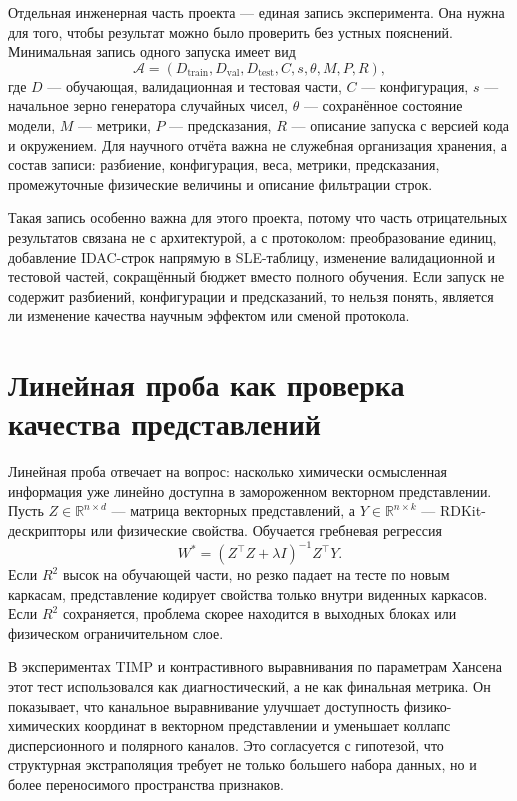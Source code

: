 \documentclass[11pt]{article}
\theoremstyle{definition}
\begin{document}
Отдельная инженерная часть проекта --- единая запись эксперимента. Она нужна для того, чтобы результат можно было проверить без устных пояснений. Минимальная запись одного запуска имеет вид
\begin{equation*}
    \mathcal A
    =
    (D_{\mathrm{train}},D_{\mathrm{val}},D_{\mathrm{test}},
     C,s,\theta,M,P,R),
\end{equation*}
где $D$ --- обучающая, валидационная и тестовая части, $C$ --- конфигурация, $s$ --- начальное зерно генератора случайных чисел, $\theta$ --- сохранённое состояние модели, $M$ --- метрики, $P$ --- предсказания, $R$ --- описание запуска с версией кода и окружением. Для научного отчёта важна не служебная организация хранения, а состав записи: разбиение, конфигурация, веса, метрики, предсказания, промежуточные физические величины и описание фильтрации строк.

Такая запись особенно важна для этого проекта, потому что часть отрицательных результатов связана не с архитектурой, а с протоколом: преобразование единиц, добавление IDAC-строк напрямую в SLE-таблицу, изменение валидационной и тестовой частей, сокращённый бюджет вместо полного обучения. Если запуск не содержит разбиений, конфигурации и предсказаний, то нельзя понять, является ли изменение качества научным эффектом или сменой протокола.

\section{Линейная проба как проверка качества представлений}
\label{app:linear-probe}

Линейная проба отвечает на вопрос: насколько химически осмысленная информация уже линейно доступна в замороженном векторном представлении. Пусть $Z\in\mathbb R^{n\times d}$ --- матрица векторных представлений, а $Y\in\mathbb R^{n\times k}$ --- RDKit-дескрипторы или физические свойства. Обучается гребневая регрессия
\begin{equation*}
    W^*=(Z^\top Z+\lambda I)^{-1}Z^\top Y.
\end{equation*}
Если $R^2$ высок на обучающей части, но резко падает на тесте по новым каркасам, представление кодирует свойства только внутри виденных каркасов. Если $R^2$ сохраняется, проблема скорее находится в выходных блоках или физическом ограничительном слое.

В экспериментах TIMP и контрастивного выравнивания по параметрам Хансена этот тест использовался как диагностический, а не как финальная метрика. Он показывает, что канальное выравнивание улучшает доступность физико-химических координат в векторном представлении и уменьшает коллапс дисперсионного и полярного каналов. Это согласуется с гипотезой, что структурная экстраполяция требует не только большего набора данных, но и более переносимого пространства признаков.
\end{document}
